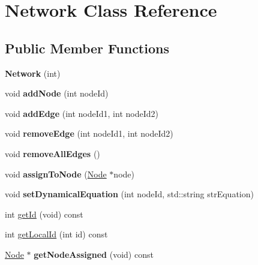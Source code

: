 \hypertarget{classNetwork}{}\section{Network Class Reference}
\label{classNetwork}
\subsection*{Public Member Functions}
\begin{DoxyCompactItemize}
\item 
{\bfseries Network} (int)\hypertarget{classNetwork_a30c34d28f6da478d4d7b597165dc95a9}{}\label{classNetwork_a30c34d28f6da478d4d7b597165dc95a9}

\item 
void {\bfseries add\+Node} (int node\+Id)\hypertarget{classNetwork_ae5cee65d8d673280142c6f1a9420b0e7}{}\label{classNetwork_ae5cee65d8d673280142c6f1a9420b0e7}

\item 
void {\bfseries add\+Edge} (int node\+Id1, int node\+Id2)\hypertarget{classNetwork_ae5a6b6ebf9ba5c8a758f54e9a368c72b}{}\label{classNetwork_ae5a6b6ebf9ba5c8a758f54e9a368c72b}

\item 
void {\bfseries remove\+Edge} (int node\+Id1, int node\+Id2)\hypertarget{classNetwork_a879adf47459ee92cbbcbadd6affb415b}{}\label{classNetwork_a879adf47459ee92cbbcbadd6affb415b}

\item 
void {\bfseries remove\+All\+Edges} ()\hypertarget{classNetwork_a900818896e85d83af131d590e68388f6}{}\label{classNetwork_a900818896e85d83af131d590e68388f6}

\item 
void {\bfseries assign\+To\+Node} (\hyperlink{classNode}{Node} $\ast$node)\hypertarget{classNetwork_a78e5489d4cf31b296366f5ccaede0fdf}{}\label{classNetwork_a78e5489d4cf31b296366f5ccaede0fdf}

\item 
void {\bfseries set\+Dynamical\+Equation} (int node\+Id, std\+::string str\+Equation)\hypertarget{classNetwork_a1e066354c2d7e40338ee2e5b3e974595}{}\label{classNetwork_a1e066354c2d7e40338ee2e5b3e974595}

\item 
int \hyperlink{classNetwork_ae30196d51c9db40feaf93cde5508d106}{get\+Id} (void) const 
\item 
int \hyperlink{classNetwork_a0b1b879abf7417e425325999a7919d15}{get\+Local\+Id} (int id) const 
\item 
\hyperlink{classNode}{Node} $\ast$ {\bfseries get\+Node\+Assigned} (void) const \hypertarget{classNetwork_a0c67b1e20e97cff7dedb84571936fd0b}{}\label{classNetwork_a0c67b1e20e97cff7dedb84571936fd0b}


\end{DoxyCompactItemize}
